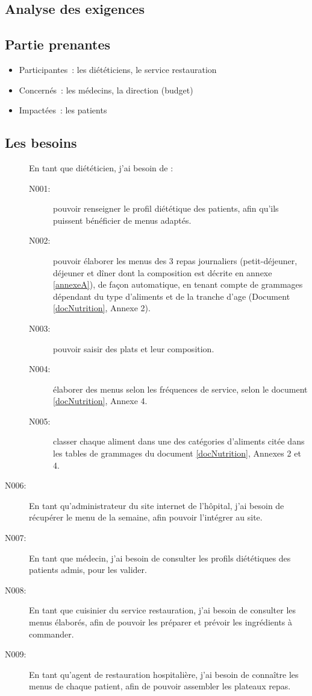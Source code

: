 \textcolor[RGB]{46, 116, 181}{\chapter{Analyse des exigences}}
\section{Partie prenantes}
\begin{itemize}
\item Participantes~: les diététiciens, le service restauration
\item Concernés~: les médecins, la direction (budget)
\item Impactées~: les patients
\end{itemize}

\section{Les besoins}
\begin{description}
\item[] En tant que diététicien, j’ai besoin de :
\begin{description}
 \item[N001:] pouvoir renseigner le profil diététique des patients, afin qu’ils
 puissent bénéficier de menus adaptés.
 \item[N002:] pouvoir élaborer les menus des 3 repas journaliers
 (petit-déjeuner, déjeuner et dîner dont la composition est décrite en annexe
 \ref{annexeA}), de façon automatique, en tenant compte de grammages dépendant du type d'aliments et de la tranche d'age (Document \ref{docNutrition}, Annexe 2).
 \item[N003:] pouvoir saisir des plats et leur composition.
 \item[N004:] élaborer des menus selon les fréquences de service, selon le
 document \ref{docNutrition}, Annexe 4.
 \item[N005:] classer chaque aliment dans une des catégories d’aliments citée
 dans les tables de grammages du document \ref{docNutrition}, Annexes 2 et 4.
\end{description}
\item[N006:] En tant qu’administrateur du site internet de l’hôpital, j’ai
besoin de récupérer le menu de la semaine, afin pouvoir l’intégrer au site.
\item[N007:] En tant que médecin, j’ai besoin de consulter les profils
diététiques des patients admis, pour les  valider.
\item[N008:] En tant que cuisinier du service restauration, j’ai besoin de
consulter les menus élaborés, afin de pouvoir les préparer et prévoir les ingrédients à commander.
\item[N009:] En tant qu’agent de restauration hospitalière,  j’ai besoin de
connaître les menus de chaque patient, afin de pouvoir assembler les plateaux repas.
\end{description}
